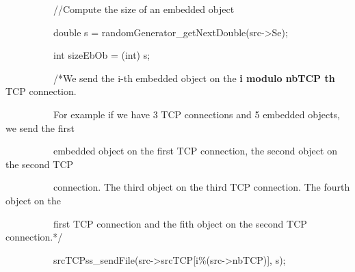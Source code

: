 \documentclass[a4paper]{article}
\begin{document}
{
\ \ \ \ \ \ \ \ \ \ //Compute the size of an embedded object}

{
\ \ \ \ \ \ \ \ \ \ double s = randomGenerator\_getNextDouble(src-{\textgreater}Se);}

{
\ \ \ \ \ \ \ \ \ \ int sizeEbOb = (int) s;}

{
\ \ \ \ \ \ \ \ \ \ /*We send the i-th embedded object on the \textbf{i modulo nbTCP th }TCP connection.}

{
\ \ \ \ \ \ \ \ \ \ For example if we have 3 TCP connections and 5 embedded objects, we send the first}

{
\ \ \ \ \ \ \ \ \ \ embedded object on the first TCP connection, the second object on the second TCP}

{
\ \ \ \ \ \ \ \ \ \ connection. The third object on the third TCP connection. The fourth object on the}

{
\ \ \ \ \ \ \ \ \ \ first TCP connection and the fith object on the second TCP connection.*/}

{
\ \ \ \ \ \ \ \ \ \ srcTCPss\_sendFile(src-{\textgreater}srcTCP[i\%(src-{\textgreater}nbTCP)], s);}

\bigskip
\end{document}
